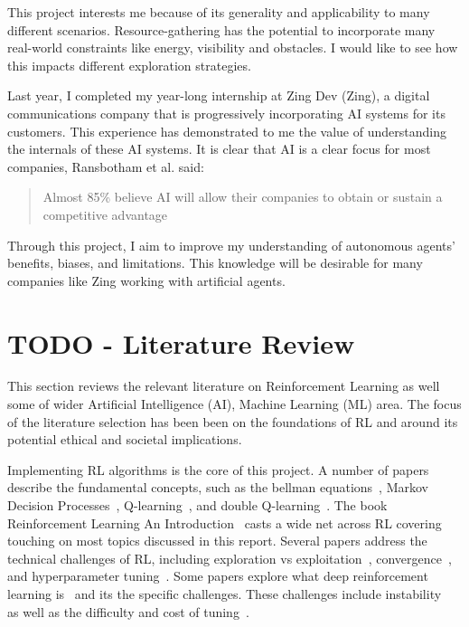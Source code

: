 \documentclass[]{final_report}
\begin{document}
This project interests me because of its generality and applicability to many different scenarios. Resource-gathering has the potential to incorporate many real-world constraints like energy, visibility and obstacles. I would like to see how this impacts different exploration strategies.

Last year, I completed my year-long internship at Zing Dev (Zing), a digital communications company that is progressively incorporating AI systems for its customers. This experience has demonstrated to me the value of understanding the internals of these AI systems. It is clear that AI is a clear focus for most companies, Ransbotham et al. said: 
\begin{quote}
  Almost 85\% believe AI will allow their companies to obtain or sustain a competitive advantage~\cite{ransbotham2017reshaping}
\end{quote}

Through this project, I aim to improve my understanding of autonomous agents' benefits, biases, and limitations. This knowledge will be desirable for many companies like Zing working with artificial agents.


\section{TODO - Literature Review}

This section reviews the relevant literature on Reinforcement Learning as well some of wider Artificial Intelligence (AI), Machine Learning (ML) area. The focus of the literature selection has been been on the foundations of RL and around its potential ethical and societal implications.

Implementing RL algorithms is the core of this project. A number of papers describe the fundamental concepts, such as the bellman equations~\cite{bellman1957}, Markov Decision Processes~\cite{meyn2012markov,sutton2018reinforcement}, Q-learning~\cite{watkins1992q}, and double Q-learning~\cite{doubleQLearning}. The book Reinforcement Learning An Introduction~\cite{sutton2018reinforcement} casts a wide net across RL covering touching on most topics discussed in this report. Several papers address the technical challenges of RL, including exploration vs exploitation~\cite{rewardEpsilonDecay},  convergence~\cite{watkins1992q, QlearningConvergance}, and hyperparameter tuning~\cite{deepRLChallanges, searchStrategies}. Some papers explore what deep reinforcement learning is~\cite{deepRLOverview} and its the specific challenges. These challenges include instability~\cite{deepOnVsOffPolicy,sutton2018reinforcement} as well as the difficulty and cost of tuning~\cite{deepRLChallanges,DeepRLCost}.
\end{document}

